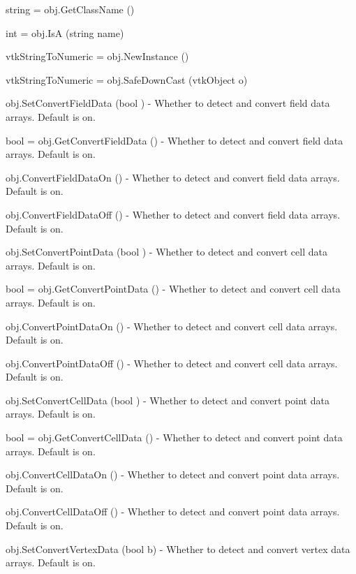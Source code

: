 \begin{DoxyItemize}
\item {\ttfamily string = obj.\-Get\-Class\-Name ()}  
\item {\ttfamily int = obj.\-Is\-A (string name)}  
\item {\ttfamily vtk\-String\-To\-Numeric = obj.\-New\-Instance ()}  
\item {\ttfamily vtk\-String\-To\-Numeric = obj.\-Safe\-Down\-Cast (vtk\-Object o)}  
\item {\ttfamily obj.\-Set\-Convert\-Field\-Data (bool )} -\/ Whether to detect and convert field data arrays. Default is on.  
\item {\ttfamily bool = obj.\-Get\-Convert\-Field\-Data ()} -\/ Whether to detect and convert field data arrays. Default is on.  
\item {\ttfamily obj.\-Convert\-Field\-Data\-On ()} -\/ Whether to detect and convert field data arrays. Default is on.  
\item {\ttfamily obj.\-Convert\-Field\-Data\-Off ()} -\/ Whether to detect and convert field data arrays. Default is on.  
\item {\ttfamily obj.\-Set\-Convert\-Point\-Data (bool )} -\/ Whether to detect and convert cell data arrays. Default is on.  
\item {\ttfamily bool = obj.\-Get\-Convert\-Point\-Data ()} -\/ Whether to detect and convert cell data arrays. Default is on.  
\item {\ttfamily obj.\-Convert\-Point\-Data\-On ()} -\/ Whether to detect and convert cell data arrays. Default is on.  
\item {\ttfamily obj.\-Convert\-Point\-Data\-Off ()} -\/ Whether to detect and convert cell data arrays. Default is on.  
\item {\ttfamily obj.\-Set\-Convert\-Cell\-Data (bool )} -\/ Whether to detect and convert point data arrays. Default is on.  
\item {\ttfamily bool = obj.\-Get\-Convert\-Cell\-Data ()} -\/ Whether to detect and convert point data arrays. Default is on.  
\item {\ttfamily obj.\-Convert\-Cell\-Data\-On ()} -\/ Whether to detect and convert point data arrays. Default is on.  
\item {\ttfamily obj.\-Convert\-Cell\-Data\-Off ()} -\/ Whether to detect and convert point data arrays. Default is on.  
\item {\ttfamily obj.\-Set\-Convert\-Vertex\-Data (bool b)} -\/ Whether to detect and convert vertex data arrays. Default is on.  

\end{DoxyItemize}

